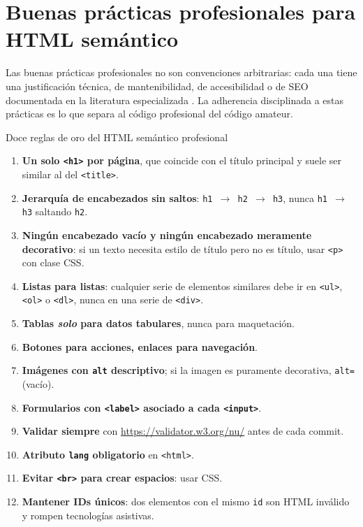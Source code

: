 \section{Buenas prácticas profesionales para HTML semántico}

Las buenas prácticas profesionales no son convenciones arbitrarias:
cada una tiene una justificación técnica, de mantenibilidad, de
accesibilidad o de SEO documentada en la literatura especializada
\cite{robbins2018learning,duckett2011html}. La adherencia disciplinada
a estas prácticas es lo que separa al código profesional del código
amateur.

\begin{cajabuenas}{Doce reglas de oro del HTML semántico profesional}
\begin{enumerate}
\item \textbf{Un solo \texttt{<h1>} por página}, que coincide con el
título principal y suele ser similar al del \texttt{<title>}.
\item \textbf{Jerarquía de encabezados sin saltos}:
\texttt{h1 $\rightarrow$ h2 $\rightarrow$ h3}, nunca
\texttt{h1 $\rightarrow$ h3} saltando \texttt{h2}.
\item \textbf{Ningún encabezado vacío y ningún encabezado meramente
decorativo}: si un texto necesita estilo de título pero no es título,
usar \texttt{<p>} con clase CSS.
\item \textbf{Listas para listas}: cualquier serie de elementos
similares debe ir en \texttt{<ul>}, \texttt{<ol>} o \texttt{<dl>},
nunca en una serie de \texttt{<div>}.
\item \textbf{Tablas \emph{solo} para datos tabulares}, nunca para
maquetación.
\item \textbf{Botones para acciones, enlaces para navegación}.
\item \textbf{Imágenes con \texttt{alt} descriptivo}; si la imagen
es puramente decorativa, \texttt{alt=  } (vacío).
\item \textbf{Formularios con \texttt{<label>} asociado a cada
\texttt{<input>}}.
\item \textbf{Validar siempre} con \url{https://validator.w3.org/nu/}
antes de cada commit.
\item \textbf{Atributo \texttt{lang} obligatorio} en \texttt{<html>}.
\item \textbf{Evitar \texttt{<br>} para crear espacios}: usar CSS.
\item \textbf{Mantener IDs únicos}: dos elementos con el mismo
\texttt{id} son HTML inválido y rompen tecnologías asistivas.
\end{enumerate}
\end{cajabuenas}

